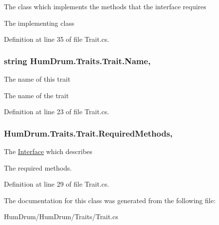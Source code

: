 The class which implements the methods that the interface requires 

The implementing class

Definition at line 35 of file Trait.\+cs.

\hypertarget{classHumDrum_1_1Traits_1_1Trait_a1127f27ad57f5578c010c4785eac06b3}{}
\subsubsection[{Name}]{\setlength{\rightskip}{0pt plus 5cm}string Hum\+Drum.\+Traits.\+Trait.\+Name\hspace{0.3cm}{\ttfamily [get]}, {\ttfamily [set]}}\label{classHumDrum_1_1Traits_1_1Trait_a1127f27ad57f5578c010c4785eac06b3}


The name of this trait 

The name of the trait

Definition at line 23 of file Trait.\+cs.

\hypertarget{classHumDrum_1_1Traits_1_1Trait_a44f53e84d7ce34f84ce3be1e60345368}{}
\subsubsection[{Required\+Methods}]{ Hum\+Drum.\+Traits.\+Trait.\+Required\+Methods\hspace{0.3cm}{\ttfamily [get]}, {\ttfamily [set]}}\label{classHumDrum_1_1Traits_1_1Trait_a44f53e84d7ce34f84ce3be1e60345368}


The \hyperlink{classHumDrum_1_1Traits_1_1Interface}{Interface} which describes 

The required methods.

Definition at line 29 of file Trait.\+cs.



The documentation for this class was generated from the following file\+:\begin{DoxyCompactItemize}
\item 
Hum\+Drum/\+Hum\+Drum/\+Traits/Trait.\+cs\end{DoxyCompactItemize}

